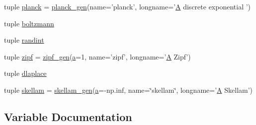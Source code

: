 \begin{DoxyCompactItemize}
tuple \hyperlink{namespacescipy_1_1stats_1_1__discrete__distns_a22944d92d65c23a30d43cf5267c1b3b8}{planck} = \hyperlink{classscipy_1_1stats_1_1__discrete__distns_1_1planck__gen}{planck\+\_\+gen}(name='planck', longname='\hyperlink{classA}{A} discrete exponential ')
\item 
tuple \hyperlink{namespacescipy_1_1stats_1_1__discrete__distns_ad85ac97a7d5fd92f96c97845f8cd3edf}{boltzmann}
\item 
tuple \hyperlink{namespacescipy_1_1stats_1_1__discrete__distns_a0e59b26c3770d192a6711436ec2c0ccb}{randint}
\item 
tuple \hyperlink{namespacescipy_1_1stats_1_1__discrete__distns_ac74b93ca0272496d4d0aff8000bc13a4}{zipf} = \hyperlink{classscipy_1_1stats_1_1__discrete__distns_1_1zipf__gen}{zipf\+\_\+gen}(\hyperlink{gen__mat5files_8m_aae328bf20413f220e38aec4d95bfd6da}{a}=1, name='zipf', longname='\hyperlink{classA}{A} Zipf')
\item 
tuple \hyperlink{namespacescipy_1_1stats_1_1__discrete__distns_a6f4af8fed44c05cf29c3871a777adcbe}{dlaplace}
\item 
tuple \hyperlink{namespacescipy_1_1stats_1_1__discrete__distns_afcc9522402025c4e2da2c1b9db4a6a28}{skellam} = \hyperlink{classscipy_1_1stats_1_1__discrete__distns_1_1skellam__gen}{skellam\+\_\+gen}(\hyperlink{gen__mat5files_8m_aae328bf20413f220e38aec4d95bfd6da}{a}=-\/np.\+inf, name=\char`\"{}skellam\char`\"{}, longname='\hyperlink{classA}{A} Skellam')
\end{DoxyCompactItemize}


\subsection{Variable Documentation}
\hypertarget{namespacescipy_1_1stats_1_1__discrete__distns_a83706ca7068fd4b3d26562aa79b3113c}{}
